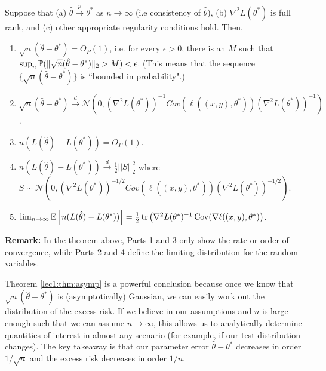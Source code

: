 \begin{theorem}
Suppose that (a) $\hat{\theta}  \overset{p}{\to} \theta^{*}$ as $n \to \infty$ (i.e consistency of $\hat{\theta}$), (b) $\nabla^{2}L(\theta^{*})$ is full rank, and  (c) other appropriate regularity conditions hold. 
Then,
\begin{enumerate}
    \item $\sqrt{n} (\hat{\theta} - \theta^{*}) = O_P(1)$, i.e. for every $\epsilon > 0$, there is an $M$ such that $\sup_n \mathbb P (\| \sqrt{n} (\hat{\theta} - \theta^{*}) \|_2 > M) < \epsilon$. (This means that the sequence $\{ \sqrt{n} (\hat{\theta} - \theta^{*}) \}$ is ``bounded in probability".)
    
    \item  $\sqrt{n}(\hat{\theta}-\theta^{*}) \overset{d}{\to} \mathcal{N} \left(0, (\nabla^{2}L(\theta^{*}))^{-1}Cov(\ell((x,y), \theta^*)) (\nabla^{2}L(\theta^{*}))^{-1} \right)$.
     \item $n (L(\hat{\theta}) - L(\theta^{*})) = O_P(1)$.
    \item $n (L(\hat{\theta}) - L(\theta^{*})) \overset{d}{\to} \frac{1}{2} ||S||_{2}^{2}$ where $S \sim \mathcal{N} \left(0, (\nabla^{2}L(\theta^{*}))^{-1/2}Cov(\ell((x,y), \theta^*)) (\nabla^{2}L(\theta^{*}))^{-1/2} \right)$.
    \item $\lim_{n \to \infty} \mathbb{E} \left[ n (L(\hat \theta) - L(\theta^*)) \right] = \frac12 \operatorname{tr}\left( \nabla^2 L(\theta^*)^{-1} \operatorname{Cov}(\nabla \ell ((x, y), \theta^*) \right)$.
\end{enumerate}
\label{lec1:thm:asymp}
\end{theorem}
\textbf{Remark:} In the theorem above, Parts 1 and 3 only show the rate or order of convergence, while Parts 2 and 4 define the limiting distribution for the random variables.

Theorem \ref{lec1:thm:asymp} is a powerful conclusion because once we know that $\sqrt{n}(\hat \theta  - \theta^*)$ is (asymptotically) Gaussian, we can easily work out the distribution of the excess risk. If we believe in our assumptions and $n$ is large enough such that we can assume $n \to \infty$, this allows us to analytically determine quantities of interest in almost any scenario (for example, if our test distribution changes). The key takeaway is that our parameter error $\hat{\theta} - \theta^*$ decreases in order $1/\sqrt{n}$ and the excess risk decreases in order $1/n$. 

